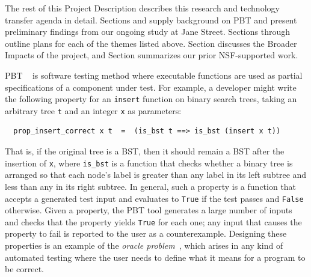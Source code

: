 \medskip

The rest of this Project Description describes this research and
technology transfer agenda in detail.  Sections
 and  supply
background on PBT and present preliminary findings from our
ongoing study at Jane Street.
%
Sections  through
 outline plans for each of the
themes listed above.
Section 
discusses the Broader Impacts of the project, and
Section  summarizes our prior
NSF-supported work.



%
PBT%
~\cite{hughes2007quickcheck}
is software testing method where
executable functions are used as partial
specifications of a component under test. For example, a developer might
write the following property for an \lstinline{insert}
function on binary search trees, taking an arbitrary tree \texttt{t}
and an integer
\texttt{x} as parameters:
\begin{lstlisting}
  prop_insert_correct x t  =  (is_bst t ==> is_bst (insert x t))
\end{lstlisting}
That is, if the original tree
is a BST, then it should remain
a BST after the insertion of \texttt{x},
where \lstinline{is_bst} is a function that checks whether a binary
tree is arranged so that each node's label is greater
than any label in its left subtree and less than any in its right
subtree.
In general, such a property is a function that
accepts a generated
test input
and evaluates to \lstinline{True} if the test passes and
\lstinline{False} otherwise.
Given a property, the PBT tool generates a
large number of inputs and
checks that the property yields \lstinline{True} for each one; any input
that causes the property to fail is reported to the user as a
{counterexample}.
%
Designing these properties is an example of
the {\em oracle problem}~\cite{barr_oracle_2015}, which arises in any kind of
automated testing where the user needs to define what it means for a program to
be correct.

